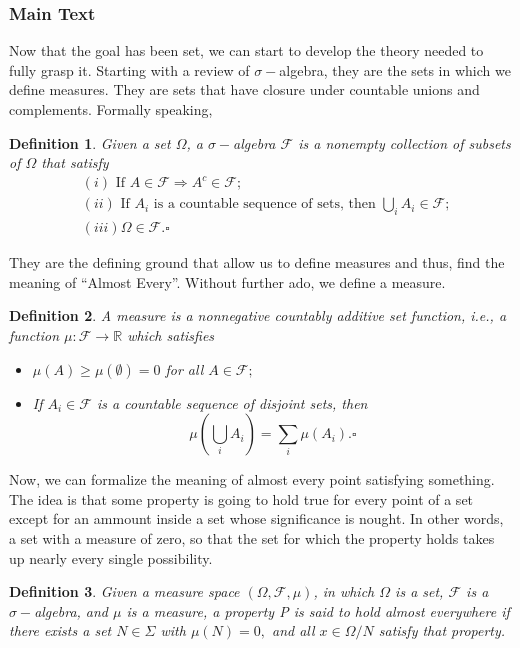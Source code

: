 \documentclass{article}
\newtheorem*{def*}{Definition}
\begin{document}
  \subsubsection{Main Text}
  Now that the goal has been set, we can start to develop the theory needed to fully grasp it. Starting with a review of $\sigma-$algebra,
they are the sets in which we define measures. They are sets that have closure under countable unions and complements. Formally speaking, 
  
 \begin{def*}
   Given a set $\Omega$, a $\sigma-$algebra $\mathcal{F}$ is a nonempty collection of subsets of $\Omega$ that satisfy
  \begin{align*}
    &(i) \text{ If }A\in \mathcal{F} \Rightarrow A^{c}\in \mathcal{F};\\
    &(ii) \text{ If } A_{i} \text{ is a countable sequence of sets, then } \bigcup_{i}A_{i}\in \mathcal{F};\\
    &(iii) \Omega\in \mathcal{F}.\square
  \end{align*}
 \end{def*}
 They are the defining ground that allow us to define measures and thus, find the meaning of ``Almost Every''. Without further ado,
we define a measure.
 \begin{def*}
   A measure is a nonnegative countably additive set function, i.e., a function $\mu:\mathcal{F}\rightarrow \mathbb{R}$ which satisfies
  \begin{itemize}
    \item[i)] $\mu(A)\geq{\mu(\emptyset)}=0$ for all $A\in \mathcal{F};$ 
    \item[ii)] If $A_{i}\in \mathcal{F}$ is a countable sequence of disjoint sets, then
      $$
        \mu(\bigcup_{i}A_{i}) = \sum\limits_{i}^{}\mu(A_{i}).\square
      $$
  \end{itemize}
 \end{def*}
 Now, we can formalize the meaning of almost every point satisfying something. The idea is that some property is going to hold true
for every point of a set except for an ammount inside a set whose significance is nought. In other words, a set with a measure of zero, so that
the set for which the property holds takes up nearly every single possibility. 
 \begin{def*}
   Given a measure space $(\Omega, \mathcal{F}, \mu)$, in which $\Omega$ is a set, $\mathcal{F}$ is a $\sigma-$algebra, and $\mu$ is a measure, 
 a property P is said to hold almost everywhere if there exists a set $N\in\Sigma$ with $\mu(N) = 0,$ and all $x\in\Omega/N$ satisfy that property.
 \end{def*}
\end{document}

